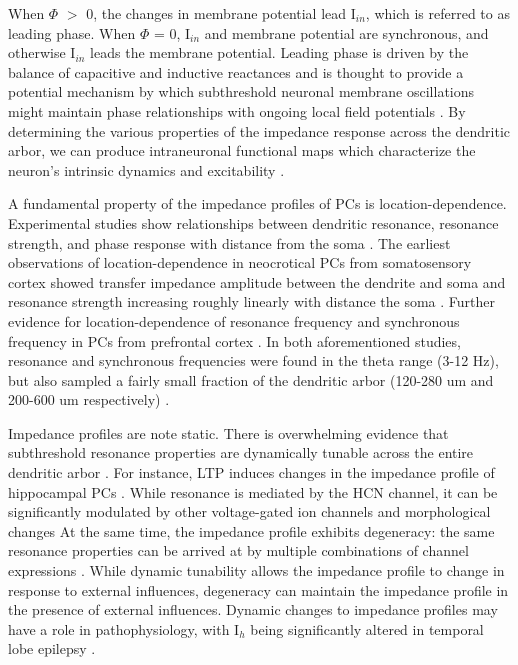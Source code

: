 \documentclass[utf8]{frontiersSCNS} %
\begin{document}
When $\Phi$ $>$ 0, the changes in membrane potential lead  I$_{in}$, which is referred to as leading phase.
When $\Phi$ = 0, I$_{in}$ and membrane potential are synchronous, and otherwise I$_{in}$ leads the membrane potential.
Leading phase is driven by the balance of capacitive and inductive reactances and is thought to provide a potential 
mechanism by which subthreshold neuronal membrane oscillations might maintain phase relationships with ongoing
local field potentials
\citep{Mauro1961-ys, Sabah1969-at, Mauro1970-km, Hu2002-ga, Hu2009-qb, Ulrich2002-dd, Cook2007-cz, Narayanan2008-zw, Vaidya2013-sx, Das2017-nz}.  By determining the various properties of the impedance response 
across the dendritic arbor, we can produce intraneuronal functional maps which characterize the neuron's intrinsic
dynamics and excitability \citep{Narayanan2012-hn}.

A fundamental property of the impedance profiles of PCs is location-dependence. Experimental
studies show relationships between dendritic resonance, resonance strength, and 
phase response with distance from the soma \citep{Das2017-nz, Narayanan2007-gw, Ulrich2002-dd, Dembrow2015-zb}.
The earliest observations of location-dependence in neocrotical PCs from somatosensory cortex 
showed transfer impedance amplitude between the dendrite and soma and resonance strength 
increasing roughly linearly with distance the soma \citep{Ulrich2002-dd}. Further evidence for 
location-dependence of resonance frequency and synchronous frequency in PCs from prefrontal cortex \citep{Dembrow2015-zb}.
In both aforementioned studies, resonance and synchronous frequencies were found in the theta 
range (3-12 Hz), but also sampled a fairly small fraction of the dendritic arbor (120-280 um and 
200-600 um respectively) \citep{Ulrich2002-dd, Dembrow2015-zb}.

Impedance profiles are note static.  There is overwhelming evidence that subthreshold resonance
properties are dynamically tunable across the entire dendritic arbor \citep{Magee2005-oq, Narayanan2007-gw, Narayanan2008-zw, Sjostrom2008-sz, Hu2009-qb, Rathour2012-am, Rathour2012-bu, Das2017-nz}.
For instance, LTP induces changes in the impedance profile of hippocampal PCs \citep{Narayanan2007-gw}.
While resonance is mediated by the HCN channel, it can be significantly modulated by other voltage-gated ion channels and morphological changes 
\citep{Hutcheon2000-gs, Hu2002-ga, Narayanan2008-zw, Zemankovics2010-zt, Rathour2012-bu, Dhupia2014-ad, Rathour2016-vv}
At the same time, the impedance profile exhibits degeneracy: the same resonance properties can be arrived at by
multiple combinations of channel expressions \citep{Rathour2012-bu, Rathour2014-pl, Das2017-nz}. While dynamic 
tunability allows the impedance profile to change in response to external influences, degeneracy can maintain the 
impedance profile in the presence of external influences.  Dynamic changes to impedance profiles may have a role in
pathophysiology, with I$_h$ being significantly altered in temporal lobe epilepsy \citep{Shin2008-za, Marcelin2009-vy}.
\end{document}
